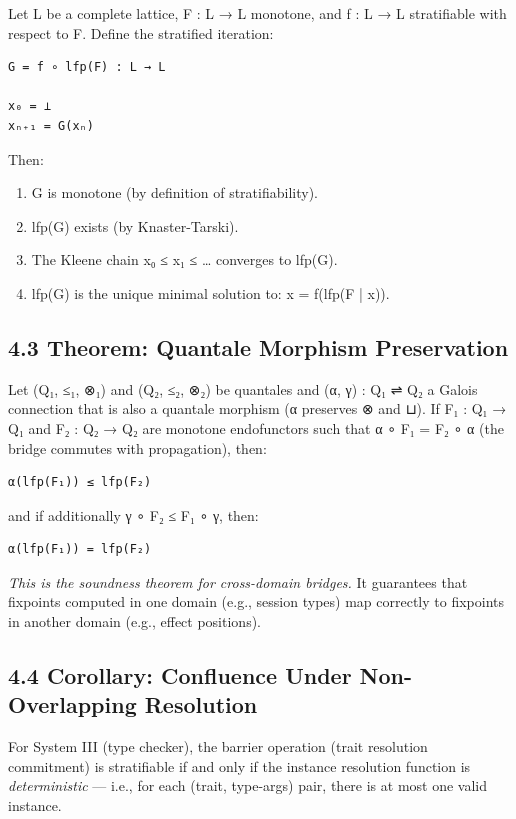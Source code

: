 \documentclass[11pt]{article}
\begin{document}
Let L be a complete lattice, F : L → L monotone, and f : L → L stratifiable
with respect to F. Define the stratified iteration:

\begin{verbatim}
G = f ∘ lfp(F) : L → L

x₀ = ⊥
xₙ₊₁ = G(xₙ)
\end{verbatim}

Then:
\begin{enumerate}
\item G is monotone (by definition of stratifiability).
\item lfp(G) exists (by Knaster-Tarski).
\item The Kleene chain x₀ ≤ x₁ ≤ \ldots{} converges to lfp(G).
\item lfp(G) is the unique minimal solution to: x = f(lfp(F | x)).
\end{enumerate}
\subsection{4.3 Theorem: Quantale Morphism Preservation}
\label{sec:org69e756b}

Let (Q₁, ≤₁, ⊗₁) and (Q₂, ≤₂, ⊗₂) be quantales and (α, γ) : Q₁ ⇌ Q₂ a
Galois connection that is also a quantale morphism (α preserves ⊗ and ⊔). If
F₁ : Q₁ → Q₁ and F₂ : Q₂ → Q₂ are monotone endofunctors such that
α ∘ F₁ = F₂ ∘ α (the bridge commutes with propagation), then:

\begin{verbatim}
α(lfp(F₁)) ≤ lfp(F₂)
\end{verbatim}

and if additionally γ ∘ F₂ ≤ F₁ ∘ γ, then:

\begin{verbatim}
α(lfp(F₁)) = lfp(F₂)
\end{verbatim}

\emph{This is the soundness theorem for cross-domain bridges.}
It guarantees that fixpoints computed in one domain (e.g., session types) map
correctly to fixpoints in another domain (e.g., effect positions).
\subsection{4.4 Corollary: Confluence Under Non-Overlapping Resolution}
\label{sec:org04f0d80}

For System III (type checker), the barrier operation (trait resolution
commitment) is stratifiable if and only if the instance resolution function is
\emph{deterministic} — i.e., for each (trait, type-args) pair, there is at most one
valid instance.
\end{document}
